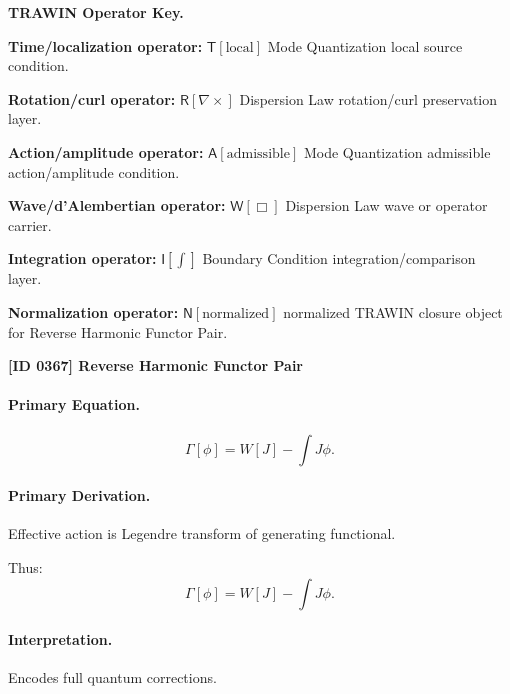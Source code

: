 \par\vspace{0.45\baselineskip}
\noindent\begin{minipage}[t]{\linewidth}
\begingroup
\small
\raggedright
\textbf{TRAWIN Operator Key.}\par
\noindent\textbf{Time/localization operator:} $\mathsf{T}\!\left[\mathrm{local}\right]$ Mode Quantization local source condition.\par
\noindent\textbf{Rotation/curl operator:} $\mathsf{R}\!\left[\nabla\times\right]$ Dispersion Law rotation/curl preservation layer.\par
\noindent\textbf{Action/amplitude operator:} $\mathsf{A}\!\left[\mathrm{admissible}\right]$ Mode Quantization admissible action/amplitude condition.\par
\noindent\textbf{Wave/d'Alembertian operator:} $\mathsf{W}\!\left[\Box\right]$ Dispersion Law wave or operator carrier.\par
\noindent\textbf{Integration operator:} $\mathsf{I}\!\left[\int\right]$ Boundary Condition integration/comparison layer.\par
\noindent\textbf{Normalization operator:} $\mathsf{N}\!\left[\mathrm{normalized}\right]$ normalized TRAWIN closure object for Reverse Harmonic Functor Pair.\par
\endgroup
\end{minipage}

\clearpage
\noindent\textbf{[ID 0367] Reverse Harmonic Functor Pair}\par
\vspace{0.35em}
\paragraph{Primary Equation.}
\begin{equation}
\Gamma[\phi] = W[J] - \int J\phi.
\end{equation}

\paragraph{Primary Derivation.}
Effective action is Legendre transform of generating functional.

Thus:
\begin{equation}
\boxed{
\Gamma[\phi] = W[J] - \int J\phi.
}
\end{equation}

\paragraph{Interpretation.}
Encodes full quantum corrections.

